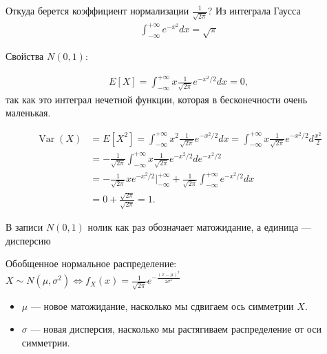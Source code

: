 \documentclass[12pt]{article}
\DeclareMathOperator{\Var}{Var}
\begin{document}
  Откуда берется коэффициент нормализации $\frac{1}{\sqrt{2\pi}}$? Из интеграла Гаусса
  \begin{align*}
    \int_{-\infty}^{+\infty} e^{-x^2} dx = \sqrt{\pi}
  \end{align*}

  Свойства $N(0, 1)$:

  \begin{align*}
    E[X] = \int_{-\infty}^{+\infty} x \frac{1}{\sqrt{2\pi}}e^{-x^2/2} dx = 0,
  \end{align*}
  так как это интеграл нечетной функции, которая в бесконечности очень маленькая.

  \begin{align*}
    \Var(X) &= E[X^2] = \int_{-\infty}^{+\infty} x^2 \frac{1}{\sqrt{2\pi}}e^{-x^2/2} dx = \int_{-\infty}^{+\infty} x \frac{1}{\sqrt{2\pi}}e^{-x^2/2}d\frac{x^2}{2} \\
            &= - \frac{1}{\sqrt{2\pi}} \int_{-\infty}^{+\infty} x \frac{1}{\sqrt{2\pi}}e^{-x^2/2}de^{-x^2/2} \\
            &= - \frac{1}{\sqrt{2\pi}} x e^{-x^2/2} \bigg|_{-\infty}^{+\infty} + \frac{1}{\sqrt{2\pi}} \int_{-\infty}^{+\infty} e^{-x^2/2} dx \\
            &= 0 + \frac{\sqrt{2\pi}}{\sqrt{2\pi}} = 1.
  \end{align*}

  В записи $N(0, 1)$ нолик как раз обозначает матожидание, а единица --- дисперсию

  Обобщенное нормальное распределение: $X \sim N(\mu, \sigma^2) \Leftrightarrow f_X(x) = \frac{1}{\sqrt{2\pi}}e^{-\frac{(x - \mu)^2}{2\sigma^2}}$

  \begin{itemize}
    \item $\mu$ --- новое матожидание, насколько мы сдвигаем ось симметрии $X$.
    \item $\sigma$ --- новая дисперсия, насколько мы растягиваем распределение от оси симметрии.
  \end{itemize}

  \begin{center}
  \end{center}
  
\end{document}
